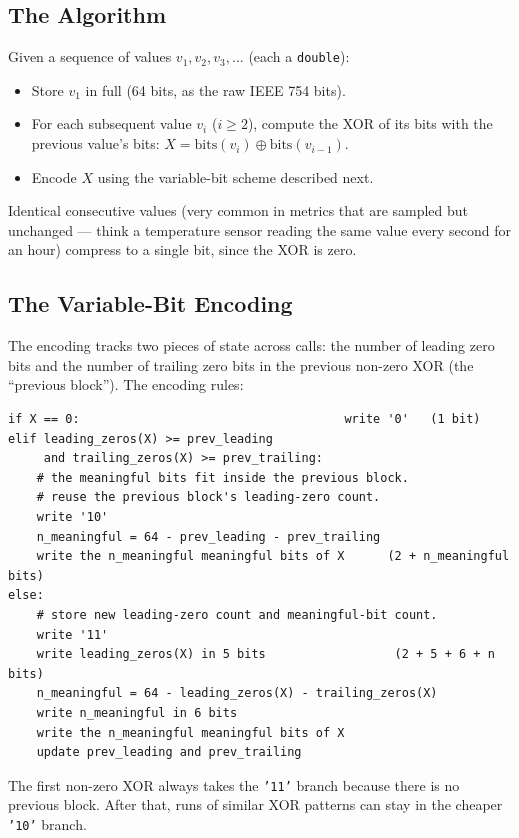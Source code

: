 \documentclass[11pt,a4paper]{article}
\begin{document}
\subsection{The Algorithm}
Given a sequence of values $v_1, v_2, v_3, \ldots$ (each a \texttt{double}):

\begin{itemize}
\item Store $v_1$ in full (64 bits, as the raw IEEE 754 bits).
\item For each subsequent value $v_i$ ($i \geq 2$), compute the XOR of its bits with the previous value's bits: $X = \text{bits}(v_i) \oplus \text{bits}(v_{i-1})$.
\item Encode $X$ using the variable-bit scheme described next.
\end{itemize}

Identical consecutive values (very common in metrics that are sampled but unchanged --- think a temperature sensor reading the same value every second for an hour) compress to a single bit, since the XOR is zero.

\subsection{The Variable-Bit Encoding}
The encoding tracks two pieces of state across calls: the number of leading zero bits and the number of trailing zero bits in the previous non-zero XOR (the ``previous block''). The encoding rules:

\begin{codebox}
\begin{lstlisting}
if X == 0:                                     write '0'   (1 bit)
elif leading_zeros(X) >= prev_leading
     and trailing_zeros(X) >= prev_trailing:
    # the meaningful bits fit inside the previous block.
    # reuse the previous block's leading-zero count.
    write '10'
    n_meaningful = 64 - prev_leading - prev_trailing
    write the n_meaningful meaningful bits of X      (2 + n_meaningful bits)
else:
    # store new leading-zero count and meaningful-bit count.
    write '11'
    write leading_zeros(X) in 5 bits                  (2 + 5 + 6 + n bits)
    n_meaningful = 64 - leading_zeros(X) - trailing_zeros(X)
    write n_meaningful in 6 bits
    write the n_meaningful meaningful bits of X
    update prev_leading and prev_trailing
\end{lstlisting}
\end{codebox}

The first non-zero XOR always takes the \texttt{'11'} branch because there is no previous block. After that, runs of similar XOR patterns can stay in the cheaper \texttt{'10'} branch.
\end{document}
